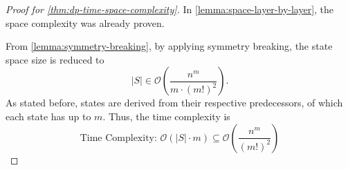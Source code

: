 \begin{proof}[Proof for \autoref{thm:dp-time-space-complexity}]
    In \autoref{lemma:space-layer-by-layer}, the space complexity was already proven.

    From \autoref{lemma:symmetry-breaking}, by applying symmetry breaking, the state space size is reduced to
    \[
        |S| \in \mathcal{O}\left( \frac{n^m}{m \cdot (m!)^2} \right)\text{.}
    \]
    As stated before, states are derived from their respective predecessors, of which each state has up to $m$. Thus, the time complexity is
    \[
        \text{Time Complexity: } \mathcal{O}\left( |S| \cdot m \right) \subseteq \mathcal{O}\left( \frac{n^m}{(m!)^2} \right)
    \]
\end{proof}

